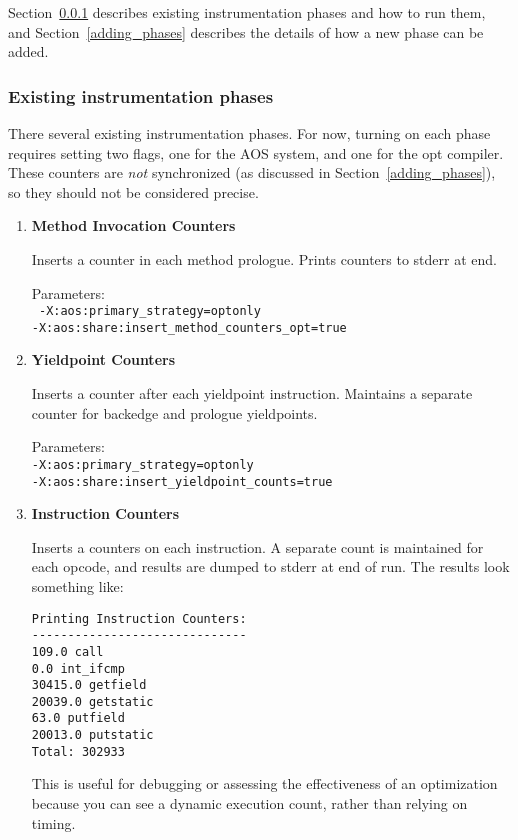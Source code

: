 Section~\ref{existing_phases} describes existing instrumentation
phases and how to run them, and Section~\ref{adding_phases}
describes the details of how a new phase can be added.
\subsubsection{Existing instrumentation phases}
\label{existing_phases}
There several existing instrumentation phases.  For now,
turning on each phase requires setting two flags, one for the AOS
system, and one for the opt compiler.  These counters are {\em not}
synchronized (as discussed in Section~\ref{adding_phases}), so they
should not be considered precise.
\begin{enumerate}
\item {\bf Method Invocation Counters} 

Inserts a counter in each method prologue.  Prints counters to stderr
at end.

Parameters: \\
{\tt
-X:aos:primary\_strategy=optonly \\
-X:aos:share:insert\_method\_counters\_opt=true}

\item {\bf Yieldpoint Counters}  

Inserts a counter after each yieldpoint instruction.  Maintains a
separate counter for backedge and prologue yieldpoints.

Parameters:\\
{\tt -X:aos:primary\_strategy=optonly \\
-X:aos:share:insert\_yieldpoint\_counts=true}




\item {\bf Instruction Counters}  

Inserts a counters on each instruction.  A separate count is
maintained for each opcode, and results are dumped to stderr at end of
run. The results look something like:

\begin{verbatim}
Printing Instruction Counters:
------------------------------
109.0 call
0.0 int_ifcmp
30415.0 getfield
20039.0 getstatic
63.0 putfield
20013.0 putstatic
Total: 302933
\end{verbatim}

This is useful for debugging or assessing the effectiveness
of an optimization because you can see a dynamic execution count, rather
than relying on timing.  


\end{enumerate}
